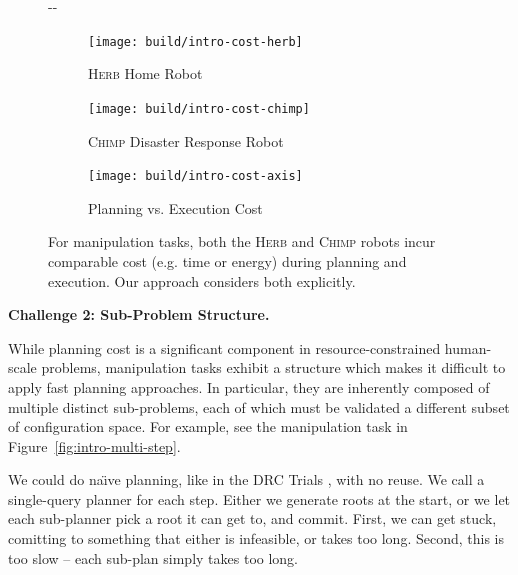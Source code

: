 \documentclass{report}
\newlength{\offsetpage}
\newenvironment{widepage}
   {\begin{adjustwidth}{-\offsetpage}{-\offsetpage}%
    \addtolength{\textwidth}{2\offsetpage}}%
{\end{adjustwidth}}
\begin{document}
{
\setlength{\offsetpage}{0.5in}
\begin{figure}
\begin{widepage}
\begin{center}
   \begin{subfigure}[b]{1.4in}
      \begin{center}
      \texttt{[image: build/intro-cost-herb]}
      \end{center}
      \caption{\textsc{Herb} Home Robot}
   \end{subfigure}%
   \quad%
   \begin{subfigure}[b]{2.0in}
      \begin{center}
      \texttt{[image: build/intro-cost-chimp]}
      \end{center}
      \caption{\textsc{Chimp} Disaster Response Robot}
   \end{subfigure}%
   \quad%
   \begin{subfigure}[b]{2.0in}
      \begin{center}
      \texttt{[image: build/intro-cost-axis]}
      \end{center}
      \caption{Planning vs. Execution Cost}
   \end{subfigure}
   \caption{For manipulation tasks,
      both the \textsc{Herb} \cite{srinivasa2012herb20}
      and \textsc{Chimp} \cite{stentz2014chimp} robots
      incur comparable cost (e.g. time or energy)
      during planning and execution.
      Our approach considers both explicitly.}
   \label{fig:plan-exec-cost}
\end{center}
\end{widepage}
\end{figure}
}

\textbf{Challenge 2: Sub-Problem Structure.}

While planning cost is a significant component
in resource-constrained human-scale problems,
manipulation tasks exhibit a structure
which makes it difficult to apply fast planning approaches.
In particular,
they are inherently composed of multiple distinct sub-problems,
each of which 
must be validated a different subset of configuration space.
For example, see the manipulation task in
Figure~\ref{fig:intro-multi-step}.

We could do na\"{\i}ve planning, like in the
DRC Trials \cite{dellin2014drc},
with no reuse.
We call a single-query planner for each step.
Either we generate roots at the start,
or we let each sub-planner pick a root it can get to, and commit.
First, we can get stuck,
comitting to something that either is infeasible, or takes too long.
Second, this is too slow --
each sub-plan simply takes too long.
\end{document}
